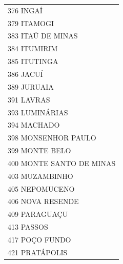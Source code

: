 \documentclass{article}
\begin{document}
\begin{longtable}[c]{m{18cm}}
\multicolumn{1}{l}{ \hspace{2em} 376 INGAÍ } \\
\multicolumn{1}{l}{ \hspace{2em} 379 ITAMOGI } \\
\multicolumn{1}{l}{ \hspace{2em} 383 ITAÚ DE MINAS } \\
\multicolumn{1}{l}{ \hspace{2em} 384 ITUMIRIM } \\
\multicolumn{1}{l}{ \hspace{2em} 385 ITUTINGA } \\
\multicolumn{1}{l}{ \hspace{2em} 386 JACUÍ } \\
\multicolumn{1}{l}{ \hspace{2em} 389 JURUAIA } \\
\multicolumn{1}{l}{ \hspace{2em} 391 LAVRAS } \\
\multicolumn{1}{l}{ \hspace{2em} 393 LUMINÁRIAS } \\
\multicolumn{1}{l}{ \hspace{2em} 394 MACHADO } \\
\multicolumn{1}{l}{ \hspace{2em} 398 MONSENHOR PAULO } \\
\multicolumn{1}{l}{ \hspace{2em} 399 MONTE BELO } \\
\multicolumn{1}{l}{ \hspace{2em} 400 MONTE SANTO DE MINAS } \\
\multicolumn{1}{l}{ \hspace{2em} 403 MUZAMBINHO } \\
\multicolumn{1}{l}{ \hspace{2em} 405 NEPOMUCENO } \\
\multicolumn{1}{l}{ \hspace{2em} 406 NOVA RESENDE } \\
\multicolumn{1}{l}{ \hspace{2em} 409 PARAGUAÇU } \\
\multicolumn{1}{l}{ \hspace{2em} 413 PASSOS } \\
\multicolumn{1}{l}{ \hspace{2em} 417 POÇO FUNDO } \\
\multicolumn{1}{l}{ \hspace{2em} 421 PRATÁPOLIS } \\

\end{longtable}
\end{document}
